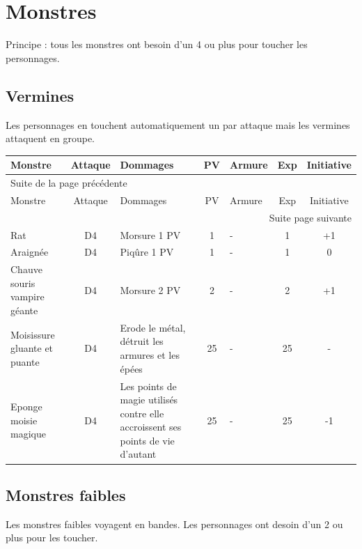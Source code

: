 \documentclass[a4paper, 11pt, twoside]{article}
\begin{document}
\section{Monstres}
\label{sec:org728185f}

Principe : tous les monstres ont besoin d'un 4 ou plus pour toucher les personnages.

\subsection{Vermines}
\label{sec:org98dfa2c}

Les personnages en touchent automatiquement un par attaque mais les vermines attaquent en groupe.

\begin{longtable}{p{3cm}|c|p{6cm}|c|p{1.3cm}|c|c}
Monstre & Attaque & Dommages & PV & Armure & Exp & Initiative\\
\hline
\endfirsthead
\multicolumn{7}{l}{Suite de la page précédente} \\
\hline

Monstre & Attaque & Dommages & PV & Armure & Exp & Initiative \\

\hline
\endhead
\hline\multicolumn{7}{r}{Suite page suivante} \\
\endfoot
\endlastfoot
\hline
Rat & D4 & Morsure 1 PV & 1 & - & 1 & +1\\
\hline
Araignée & D4 & Piqûre 1 PV & 1 & - & 1 & 0\\
\hline
Chauve souris vampire géante & D4 & Morsure 2 PV & 2 & - & 2 & +1\\
\hline
Moisissure gluante et puante & D4 & Erode le métal, détruit les armures et les épées & 25 & - & 25 & -\\
\hline
Eponge moisie magique & D4 & Les points de magie utilisés contre elle accroissent ses points de vie d'autant & 25 & - & 25 & -1\\
\end{longtable}

\newpage

\subsection{Monstres faibles}
\label{sec:org22dbc24}

Les monstres faibles voyagent en bandes. Les personnages ont desoin d'un 2 ou plus pour les toucher.
\end{document}
